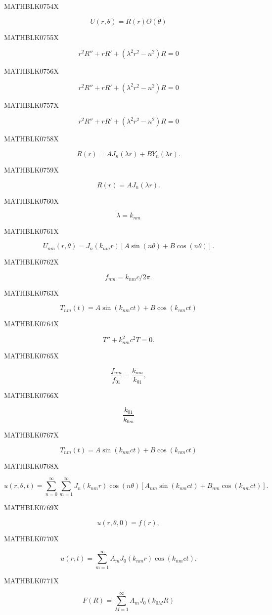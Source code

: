 \documentclass[
  ukrainian,
]{article}
\begin{document}
MATHBLK0754X

\[
U(r, \theta) = R(r) \Theta(\theta)
\]

MATHBLK0755X

\[
r^2R'' + rR' + (\lambda^2r^2 - n^2)R = 0
\]

MATHBLK0756X

\[
r^2R'' + rR' + (\lambda^2r^2 - n^2) R = 0
\]

MATHBLK0757X

\[
r^2R'' + rR' + (\lambda^2r^2 - n^2)R = 0
\]

MATHBLK0758X

\[
R(r) = AJ_n(\lambda r) + BY_n(\lambda r).
\]

MATHBLK0759X

\[
R(r) = AJ_n(\lambda r).
\]

MATHBLK0760X

\[
\lambda = k_{nm}
\]

MATHBLK0761X

\[
U_{nm}(r, \theta) = J_n(k_{nm}r) [A \sin(n\theta) + B \cos(n\theta)].
\]

MATHBLK0762X

\[
f_{nm} = k_{nm}c/2\pi.
\]

MATHBLK0763X

\[
T_{nm}(t) = A \sin(k_{nm}ct) + B \cos(k_{nm}ct)
\]

MATHBLK0764X

\[
T'' + k_{nm}^2 c^2 T = 0.
\]

MATHBLK0765X

\[
\frac{f_{nm}}{f_{01}} = \frac{k_{nm}}{k_{01}} ,
\]

MATHBLK0766X

\[
\frac{k_{01}}{k_{0m}}
\]

MATHBLK0767X

\[
T_{nm}(t) = A \sin(k_{nm}ct) + B \cos(k_{nm}ct)
\]

MATHBLK0768X

\[
u(r, \theta, t) = \sum_{n=0}^{\infty} \sum_{m=1}^{\infty} J_n(k_{nm}r) \cos(n\theta) [A_{nm}\sin(k_{nm}ct) + B_{nm}\cos(k_{nm}ct)].
\]

MATHBLK0769X

\[
u(r, \theta, 0) = f(r),
\]

MATHBLK0770X

\[
u(r, t) = \sum_{m=1}^{\infty} A_m J_0(k_{nm}r) \cos(k_{nm}ct).
\]

MATHBLK0771X

\[
F(R) = \sum_{M=1}^{\infty} A_m J_0(k_{0M}R)
\]
\end{document}
